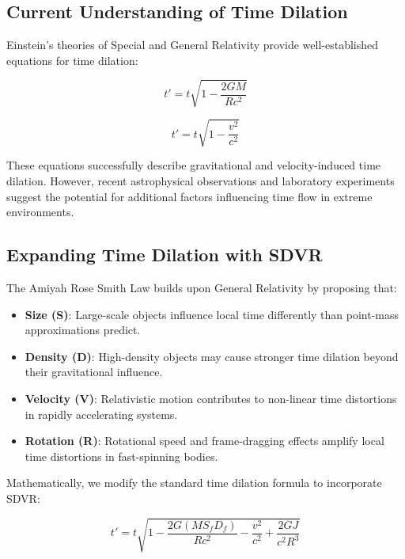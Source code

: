 \documentclass[12pt]{article}
\begin{document}
\subsection{Current Understanding of Time Dilation}

Einstein’s theories of Special and General Relativity provide well-established equations for time dilation:

\begin{equation}
t' = t \sqrt{1 - \frac{2GM}{Rc^2}}
\end{equation}

\begin{equation}
t' = t \sqrt{1 - \frac{v^2}{c^2}}
\end{equation}

These equations successfully describe gravitational and velocity-induced time dilation. However, recent astrophysical observations and laboratory experiments suggest the potential for additional factors influencing time flow in extreme environments.

\subsection{Expanding Time Dilation with SDVR}

The Amiyah Rose Smith Law builds upon General Relativity by proposing that:

\begin{itemize}
    \item \textbf{Size (S)}: Large-scale objects influence local time differently than point-mass approximations predict.
    \item \textbf{Density (D)}: High-density objects may cause stronger time dilation beyond their gravitational influence.
    \item \textbf{Velocity (V)}: Relativistic motion contributes to non-linear time distortions in rapidly accelerating systems.
    \item \textbf{Rotation (R)}: Rotational speed and frame-dragging effects amplify local time distortions in fast-spinning bodies.
\end{itemize}

Mathematically, we modify the standard time dilation formula to incorporate SDVR:

\begin{equation}
t' = t \sqrt{1 - \frac{2G (M S_f D_f)}{Rc^2} - \frac{v^2}{c^2} + \frac{2 G J}{c^2 R^3}}
\end{equation}
\end{document}

